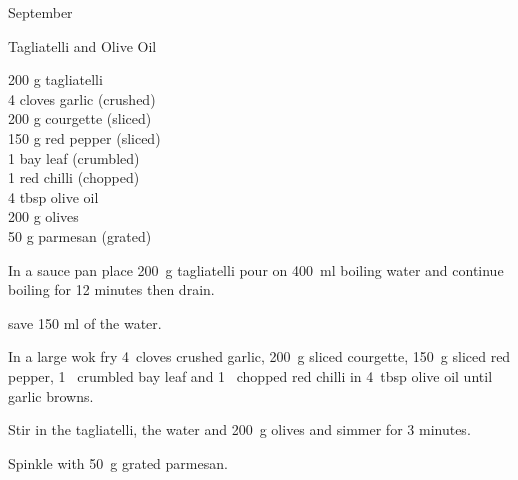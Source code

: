 \begin{menu}{September}
    \begin{recipe}{1}{Tagliatelli and Olive Oil}%
		\begin{ingredients}
		200 g tagliatelli  \\
	4 cloves garlic (crushed) \\
	200 g courgette (sliced) \\
	150 g red pepper (sliced) \\
	1  bay leaf (crumbled) \\
	1  red chilli (chopped) \\
	4 tbsp olive oil  \\
	200 g olives  \\
	50 g parmesan (grated) \\
	
		\end{ingredients}
	
    \begin{instructions}
    \item 
      In a
      sauce pan
      place
      200~g  tagliatelli
      pour on
      400~ml  boiling water and continue boiling for 12 minutes then drain.
    
        save 150 ml of the water.
      \item 
        In a large wok fry
        4~cloves crushed garlic,
        200~g sliced courgette,
        150~g sliced red pepper,
        1~ crumbled bay leaf
        and
        1~ chopped red chilli
        in
        4~tbsp  olive oil
        until garlic browns.
      \item 
        Stir in the tagliatelli,
        the water
        and
        200~g  olives
        and simmer for 3 minutes.
      \item 
        Spinkle with
        50~g grated parmesan.
      
    \end{instructions}
    \end{recipe}%
  
    \clearpage
    \end{menu}
	
